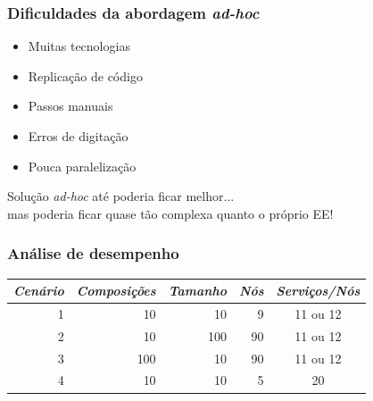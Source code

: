 \documentclass{beamer}
\newcommand\adhoc{\emph{ad-hoc}\xspace}
\begin{document}

\begin{frame}
\frametitle{Dificuldades da abordagem \adhoc}

\begin{itemize}
\item Muitas tecnologias
\item Replicação de código
\item Passos manuais
\item Erros de digitação
\item Pouca paralelização
\end{itemize}

\vspace{0.5cm}

Solução \adhoc até poderia ficar melhor... \\
mas poderia ficar quase tão complexa quanto o próprio EE!


\end{frame}



\begin{frame}
\frametitle{Análise de desempenho}

\begin{table}
\centering
\begin{tabular}{r r r r c} \hline
\emph{Cenário} & \emph{Composições} & \emph{Tamanho} & \emph{Nós} & \emph{Serviços/Nós} \\ \hline
1 &  10 &  10 &  9 & 11 ou 12 \\
2 &  10 & 100 & 90 & 11 ou 12 \\
3 & 100 &  10 & 90 & 11 ou 12 \\
4 &  10 &  10 &  5 &       20 \\
\hline \end{tabular}
\end{table}

\end{frame}


\end{document}
